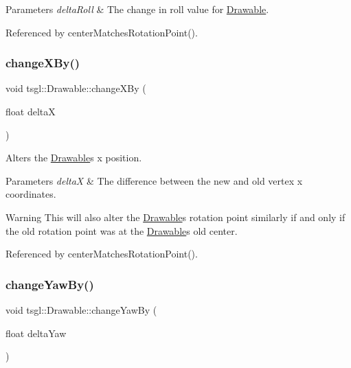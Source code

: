\begin{DoxyParams}{Parameters}
{\em delta\+Roll} & The change in roll value for \hyperlink{classtsgl_1_1_drawable}{Drawable}. \\
\hline
\end{DoxyParams}


Referenced by center\+Matches\+Rotation\+Point().

\mbox{\label{classtsgl_1_1_drawable_a5f3c278c5f0fb64ac285ee8326c87987}} 
\subsubsection{\texorpdfstring{change\+X\+By()}{changeXBy()}}
{\footnotesize\ttfamily void tsgl\+::\+Drawable\+::change\+X\+By (\begin{DoxyParamCaption}\item[{float}]{deltaX }\end{DoxyParamCaption})\hspace{0.3cm}{\ttfamily [virtual]}}



Alters the \hyperlink{classtsgl_1_1_drawable}{Drawable}\textquotesingle{}s x position. 


\begin{DoxyParams}{Parameters}
{\em deltaX} & The difference between the new and old vertex x coordinates. \\
\hline
\end{DoxyParams}
\begin{DoxyWarning}{Warning}
This will also alter the \hyperlink{classtsgl_1_1_drawable}{Drawable}\textquotesingle{}s rotation point similarly if and only if the old rotation point was at the \hyperlink{classtsgl_1_1_drawable}{Drawable}\textquotesingle{}s old center. 
\end{DoxyWarning}


Referenced by center\+Matches\+Rotation\+Point().

\mbox{\label{classtsgl_1_1_drawable_a3a57e4a919a30931942d5f5f20f5647c}} 
\subsubsection{\texorpdfstring{change\+Yaw\+By()}{changeYawBy()}}
{\footnotesize\ttfamily void tsgl\+::\+Drawable\+::change\+Yaw\+By (\begin{DoxyParamCaption}\item[{float}]{delta\+Yaw }\end{DoxyParamCaption})\hspace{0.3cm}{\ttfamily [virtual]}}



